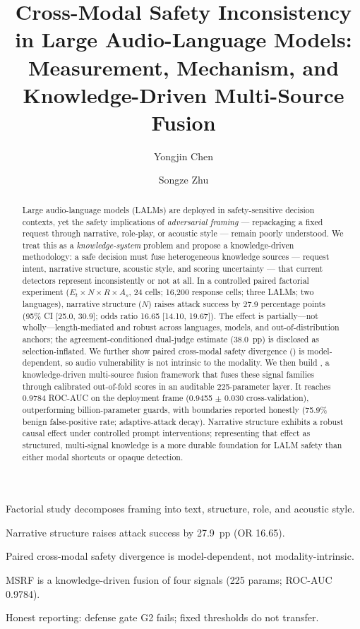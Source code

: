 \documentclass[preprint,12pt,authoryear]{elsarticle}
\begin{document}
\begin{frontmatter}

\begin{highlights}
\item Factorial study decomposes framing into text, structure, role, and acoustic style.
\item Narrative structure raises attack success by 27.9~pp (OR 16.65).
\item Paired cross-modal safety divergence is model-dependent, not modality-intrinsic.
\item MSRF is a knowledge-driven fusion of four signals (225 params; ROC-AUC 0.9784).
\item Honest reporting: defense gate G2 fails; fixed thresholds do not transfer.
\end{highlights}

\title{Cross-Modal Safety Inconsistency in Large Audio-Language Models: Measurement, Mechanism, and Knowledge-Driven Multi-Source Fusion}

\author[aff1]{Yongjin Chen}
\author[aff1,cor1]{Songze Zhu}

\begin{abstract}
Large audio-language models (LALMs) are deployed in safety-sensitive decision
contexts, yet the safety implications of \emph{adversarial framing} ---
repackaging a fixed request through narrative, role-play, or acoustic style ---
remain poorly understood. We treat this as a \emph{knowledge-system} problem
and propose a knowledge-driven methodology: a safe decision must fuse
heterogeneous knowledge sources --- request intent, narrative structure,
acoustic style, and scoring uncertainty --- that current detectors represent
inconsistently or not at all. In a controlled paired factorial experiment
($E_t \times N \times R \times A_s$, 24 cells; 16{,}200 response cells; three
LALMs; two languages), narrative structure ($N$) raises attack success by
27.9 percentage points (95\% CI [25.0, 30.9]; odds ratio 16.65 [14.10,
19.67]). The effect is partially---not wholly---length-mediated and robust
across languages, models, and out-of-distribution anchors; the
agreement-conditioned dual-judge estimate (38.0~pp) is disclosed as
selection-inflated. We further
show paired cross-modal safety divergence (\PCSD) is model-dependent, so
audio vulnerability is not intrinsic to the modality. We then build \MSRF{}, a
knowledge-driven multi-source fusion framework that fuses these signal
families through calibrated out-of-fold scores in an auditable 225-parameter
layer. It reaches 0.9784 ROC-AUC on the deployment frame (0.9455 $\pm$ 0.030
cross-validation), outperforming billion-parameter guards, with boundaries
reported honestly (75.9\% benign false-positive rate; adaptive-attack decay).
Narrative structure exhibits a robust causal effect under controlled prompt
interventions; representing that effect as structured, multi-signal knowledge
is a more durable foundation for LALM safety than either modal shortcuts or
opaque detection.
\end{abstract}


\end{frontmatter}
\end{document}
